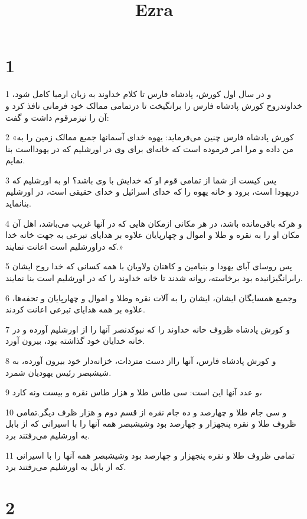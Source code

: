 

\title{Ezra}

 
\chapter{1}

\par 1 و در سال اول کورش، پادشاه فارس تا کلام خداوند به زبان ارمیا کامل شود، خداوندروح کورش پادشاه فارس را برانگیخت تا درتمامی ممالک خود فرمانی نافذ کرد و آن را نیزمرقوم داشت و گفت:
\par 2 «کورش پادشاه فارس چنین می‌فرماید: یهوه خدای آسمانها جمیع ممالک زمین را به من داده و مرا امر فرموده است که خانه‌ای برای وی در اورشلیم که در یهودااست بنا نمایم.
\par 3 پس کیست از شما از تمامی قوم او که خدایش با وی باشد؟ او به اورشلیم که دریهودا است، برود و خانه یهوه را که خدای اسرائیل و خدای حقیقی است، در اورشلیم بنانماید.
\par 4 و هر‌که باقی‌مانده باشد، در هر مکانی ازمکان هایی که در آنها غریب می‌باشد، اهل آن مکان او را به نقره و طلا و اموال و چهارپایان علاوه بر هدایای تبرعی به جهت خانه خدا که دراورشلیم است اعانت نمایند.»
\par 5 پس روسای آبای یهودا و بنیامین و کاهنان ولاویان با همه کسانی که خدا روح ایشان رابرانگیزانیده بود برخاسته، روانه شدند تا خانه خداوند را که در اورشلیم است بنا نمایند.
\par 6 وجمیع همسایگان ایشان، ایشان را به آلات نقره وطلا و اموال و چهارپایان و تحفه‌ها، علاوه بر همه هدایای تبرعی اعانت کردند.
\par 7 و کورش پادشاه ظروف خانه خداوند را که نبوکدنصر آنها را از اورشلیم آورده و در خانه خدایان خود گذاشته بود، بیرون آورد.
\par 8 و کورش پادشاه فارس، آنها رااز دست متردات، خزانه‌دار خود بیرون آورده، به شیشبصر رئیس یهودیان شمرد.
\par 9 و عدد آنها این است: سی طاس طلا و هزار طاس نقره و بیست ونه کارد،
\par 10 و سی جام طلا و چهارصد و ده جام نقره از قسم دوم و هزار ظرف دیگر.تمامی ظروف طلا و نقره پنجهزار و چهارصد بود وشیشبصر همه آنها را با اسیرانی که از بابل به اورشلیم می‌رفتند برد.
\par 11 تمامی ظروف طلا و نقره پنجهزار و چهارصد بود وشیشبصر همه آنها را با اسیرانی که از بابل به اورشلیم می‌رفتند برد.
 
\chapter{2}

